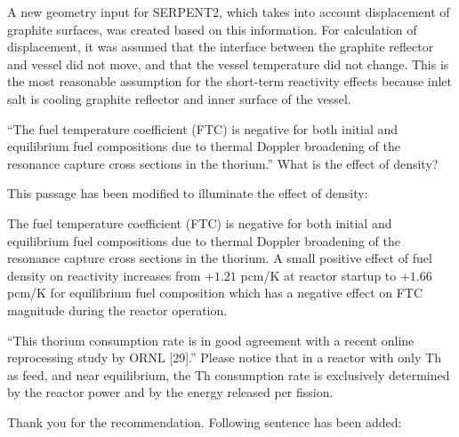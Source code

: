 \documentclass[answers,11pt]{exam}
\begin{document}
\begin{questions}
\begin{solution}
                        A new geometry input for SERPENT2, which takes into 
                        account displacement of graphite surfaces, was created 
                        based on this information. For calculation of 
                        displacement, it was assumed that the interface between 
                        the graphite reflector and vessel did not move, and 
                        that the vessel temperature did not change. This is the 
                        most reasonable assumption for the short-term 
                        reactivity effects because inlet salt is cooling 
                        graphite reflector and inner surface of the vessel.

        \end{solution}


        \question ``The fuel temperature coefficient (FTC) is negative for both 
        initial and equilibrium fuel compositions due to thermal Doppler 
        broadening of the resonance capture cross sections in the thorium.'' 
        What is the effect of density?
        \begin{solution}
                This passage has been modified to illuminate the effect of density:
                
                The fuel temperature coefficient (FTC) is negative for both 
                initial and equilibrium fuel compositions due to thermal 
                Doppler broadening of the resonance capture cross sections in 
                the thorium. A small positive effect of fuel density on 
                reactivity increases from $+1.21$ pcm/K at reactor startup to 
                $+1.66$ pcm/K for equilibrium fuel composition which has 
                a negative effect on FTC magnitude during the reactor operation. 
        \end{solution}


        \question ``This thorium consumption rate is in good agreement with a 
        recent online reprocessing study by ORNL [29].'' Please notice that in a 
        reactor with only Th as feed, and near equilibrium, the Th consumption 
        rate is  exclusively determined by the reactor power and by the energy 
        released per fission.  
        \begin{solution}
                Thank you for the recommendation. Following sentence has been 
                added:
                

\end{solution}
\end{questions}
\end{document}
